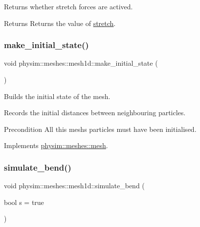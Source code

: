 Returns whether stretch forces are actived. 

\begin{DoxyReturn}{Returns}
Returns the value of \hyperlink{classphysim_1_1meshes_1_1mesh1d_a2c5233fc91df5ae5ac41759e4d8419da}{stretch}. 
\end{DoxyReturn}
\mbox{\label{classphysim_1_1meshes_1_1mesh1d_a6f2275fbab0ddfcbf523cc5a359e1d9c}} 
\subsubsection{\texorpdfstring{make\+\_\+initial\+\_\+state()}{make\_initial\_state()}}
{\footnotesize\ttfamily void physim\+::meshes\+::mesh1d\+::make\+\_\+initial\+\_\+state (\begin{DoxyParamCaption}{ }\end{DoxyParamCaption})\hspace{0.3cm}{\ttfamily [virtual]}}



Builds the initial state of the mesh. 

Records the initial distances between neighbouring particles.

\begin{DoxyPrecond}{Precondition}
All this mesh\textquotesingle{}s particles must have been initialised. 
\end{DoxyPrecond}


Implements \hyperlink{classphysim_1_1meshes_1_1mesh_a62f877dd42bc306ef70c76fc172f245f}{physim\+::meshes\+::mesh}.

\mbox{\label{classphysim_1_1meshes_1_1mesh1d_aaea453fcd1f5f41b6674da822bf53b2f}} 
\subsubsection{\texorpdfstring{simulate\+\_\+bend()}{simulate\_bend()}}
{\footnotesize\ttfamily void physim\+::meshes\+::mesh1d\+::simulate\+\_\+bend (\begin{DoxyParamCaption}\item[{bool}]{s = {\ttfamily true} }\end{DoxyParamCaption})}



